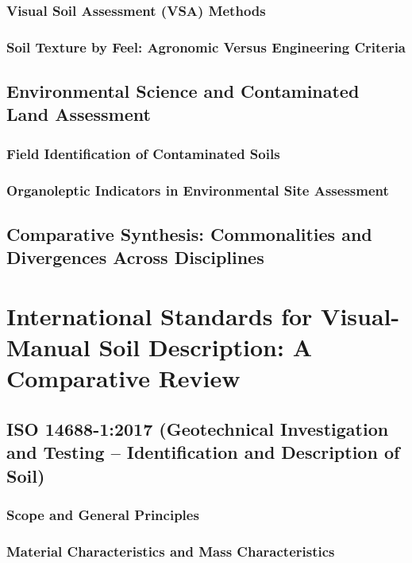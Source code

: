 \subsubsection{Visual Soil Assessment (VSA) Methods}

\subsubsection{Soil Texture by Feel: Agronomic Versus Engineering Criteria}

\subsection{Environmental Science and Contaminated Land Assessment}

\subsubsection{Field Identification of Contaminated Soils}

\subsubsection{Organoleptic Indicators in Environmental Site Assessment}

\subsection{Comparative Synthesis: Commonalities and Divergences Across Disciplines}

\section{International Standards for Visual-Manual Soil Description: A Comparative Review}

\subsection{ISO 14688-1:2017 (Geotechnical Investigation and Testing -- Identification and Description of Soil)}

\subsubsection{Scope and General Principles}

\subsubsection{Material Characteristics and Mass Characteristics}

